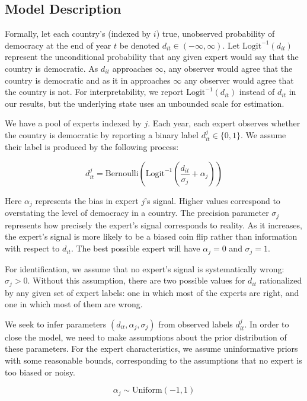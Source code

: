 \documentclass[letterpaper]{article}
\begin{document}
\subsection{Model Description}

Formally, let each country's (indexed by $i$) true, unobserved probability of democracy at the end of year $t$ be denoted $d_{it} \in (-\infty,\infty)$.  Let $\mbox{Logit}^{-1}(d_{it})$ represent the unconditional probability that any given expert would say that the country is democratic.  As $d_{it}$ approaches $\infty$, any observer would agree that the country is democratic and as it in approaches $\infty$ any observer would agree that the country is not.  For interpretability, we report $\mbox{Logit}^{-1}(d_{it})$ instead of $d_{it}$ in our results, but the underlying state uses an unbounded scale for estimation.

We have a pool of experts indexed by $j$.  Each year, each expert observes whether the country is democratic by reporting a binary label $d_{it}^j \in \{0,1\}$. We assume their label is produced by the following process:

\[  d_{it}^j = \mbox{Bernoulli}(\mbox{Logit}^{-1} (
       \frac{d_{it}}{\sigma_j} + \alpha_j
       ))
\]

Here $\alpha_j$ represents the bias in expert $j$'s signal. Higher values correspond to overstating the level of democracy in a country.  The precision parameter $\sigma_j$ represents how precisely the expert's signal corresponds to reality.  As it increases, the expert's signal is more likely to be a biased coin flip rather than information with respect to $d_{it}$.  The best possible expert will have $\alpha_j = 0$ and $\sigma_j = 1$.  

For identification, we assume that no expert's signal is systematically wrong: $\sigma_j > 0$.  Without this assumption, there are two possible values for $d_{it}$ rationalized by any given set of expert labels: one in which most of the experts are right, and one in which most of them are wrong.

We seek to infer parameters $(d_{it}, \alpha_j, \sigma_j)$ from observed labels $d_{it}^j$.  In order to close the model, we need to make assumptions about the prior distribution of these parameters.  For the expert characteristics, we assume uninformative priors with some reasonable bounds, corresponding to the assumptions that no expert is too biased or noisy.

\[ \alpha_j \sim \mbox{Uniform}(-1, 1) \]
\end{document}
